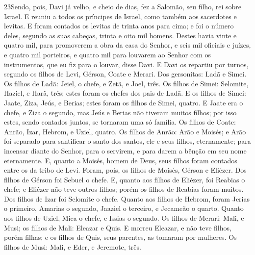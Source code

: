 \lettrine{23} Sendo, pois, Davi já velho, e cheio de dias, fez
a Salomão, seu filho, rei sobre Israel. E reuniu a todos os
príncipes de Israel, como também aos sacerdotes e levitas. E
foram contados os levitas de trinta anos para cima; e foi o número
deles, segundo as suas cabeças, trinta e oito mil homens. Destes
havia vinte e quatro mil, para promoverem a obra da casa do Senhor,
e seis mil oficiais e juízes, e quatro mil porteiros, e quatro
mil para louvarem ao Senhor com os instrumentos, que eu fiz para o
louvar, disse Davi. E Davi os repartiu por turnos, segundo os
filhos de Levi, Gérson, Coate e Merari. Dos gersonitas: Ladã e
Simei. Os filhos de Ladã: Jeiel, o chefe, e Zetã, e Joel, três.
Os filhos de Simei: Selomite, Haziel, e Harã, três; estes foram
os chefes dos pais de Ladã. E os filhos de Simei: Jaate,
Ziza, Jeús, e Berias; estes foram os filhos de Simei, quatro.
E Jaate era o chefe, e Ziza o segundo, mas Jeús e Berias não
tiveram muitos filhos; por isso estes, sendo contados juntos, se
tornaram uma só família. Os filhos de Coate: Anrão, Izar,
Hebrom, e Uziel, quatro. Os filhos de Anrão: Arão e Moisés; e
Arão foi separado para santificar o santo dos santos, ele e seus
filhos, eternamente; para incensar diante do Senhor, para o
servirem, e para darem a bênção em seu nome eternamente. E,
quanto a Moisés, homem de Deus, seus filhos foram contados entre os
da tribo de Levi. Foram, pois, os filhos de Moisés, Gérson e
Eliézer. Dos filhos de Gérson foi Sebuel o chefe. E,
quanto aos filhos de Eliézer, foi Reabias o chefe; e Eliézer não
teve outros filhos; porém os filhos de Reabias foram muitos.
Dos filhos de Izar foi Selomite o chefe. Quanto aos
filhos de Hebrom, foram Jerias o primeiro, Amarias o segundo,
Jaaziel o terceiro, e Jecameão o quarto. Quanto aos filhos de
Uziel, Mica o chefe, e Issias o segundo. Os filhos de Merari:
Mali, e Musi; os filhos de Mali: Eleazar e Quis. E morreu
Eleazar, e não teve filhos, porém filhas; e os filhos de Quis, seus
parentes, as tomaram por mulheres. Os filhos de Musi: Mali, e
Eder, e Jeremote, três.

